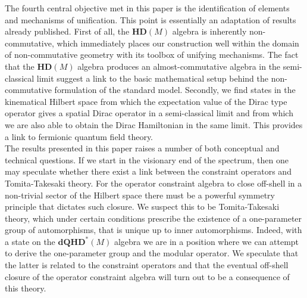 \documentclass[12pt]{article}
\begin{document}
The fourth central objective met in this paper is the identification of elements and mechanisms of unification. This point is essentially an adaptation of results already published. 
First of all, the  $\mathbf{HD}(M) $ algebra is inherently non-commutative, which immediately places our construction well within the domain of non-commutative geometry with its toolbox of unifying mechanisms. %
The fact that the  $\mathbf{HD}(M) $ algebra produces an almost-commutative algebra in the semi-classical limit %
suggest a link to the basic mathematical setup behind the non-commutative formulation of the standard model. %
%
Secondly, we find states in the kinematical Hilbert space from which the expectation value of the Dirac type operator gives a spatial Dirac operator in a semi-classical limit and from which we are also able to obtain the Dirac Hamiltonian in the same limit. %
This provides a link to fermionic quantum field theory.\\


The results presented in this paper raises a number of both conceptual and technical questions. If we start in the visionary end of the spectrum, then one may speculate whether there exist a link between the constraint operators and Tomita-Takesaki theory. For the operator constraint algebra to close off-shell in a non-trivial sector of the Hilbert space there must be a powerful symmetry principle that dictates such closure. We suspect this to be Tomita-Takesaki theory, which under certain conditions prescribe the existence of a one-parameter group of automorphisms, that is unique up to inner automorphisms. Indeed, with a state on the $\mathbf{dQHD}^*(M) $ algebra we are in a position where we can attempt to derive the one-parameter group and the modular operator. We speculate that the latter is related to the constraint operators and that the eventual off-shell closure of the operator constraint algebra will turn out to be a consequence of this theory. %
\end{document}
